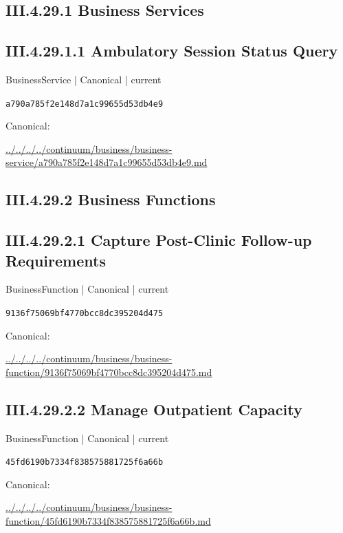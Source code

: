 \documentclass[10pt,a4paper]{article}
\begin{document}
\subsection*{III.4.29.1 Business Services}
\subsection*{III.4.29.1.1 Ambulatory Session Status Query}
{\small BusinessService | Canonical | current}\par
\texttt{a790a785f2e148d7a1c99655d53db4e9}\par
Canonical: \par
{\footnotesize\url{../../../../continuum/business/business-service/a790a785f2e148d7a1c99655d53db4e9.md}}\par
\subsection*{III.4.29.2 Business Functions}
\subsection*{III.4.29.2.1 Capture Post-Clinic Follow-up Requirements}
{\small BusinessFunction | Canonical | current}\par
\texttt{9136f75069bf4770bcc8dc395204d475}\par
Canonical: \par
{\footnotesize\url{../../../../continuum/business/business-function/9136f75069bf4770bcc8dc395204d475.md}}\par
\subsection*{III.4.29.2.2 Manage Outpatient Capacity}
{\small BusinessFunction | Canonical | current}\par
\texttt{45fd6190b7334f838575881725f6a66b}\par
Canonical: \par
{\footnotesize\url{../../../../continuum/business/business-function/45fd6190b7334f838575881725f6a66b.md}}\par
\end{document}
